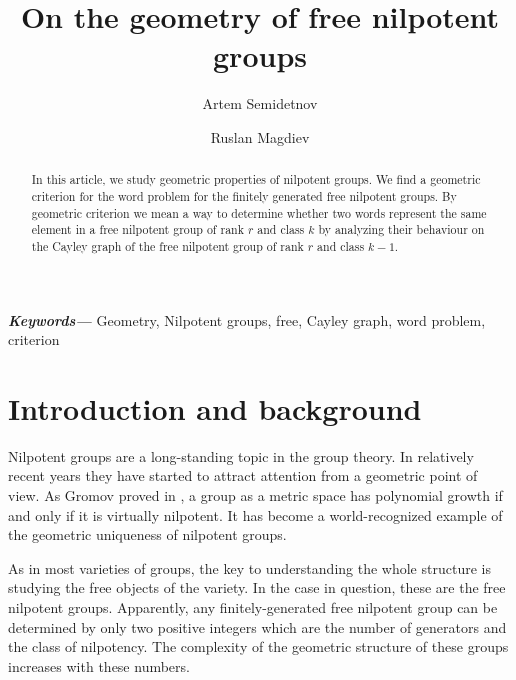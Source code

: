 \documentclass[11pt]{amsart}
\theoremstyle{plain}
\theoremstyle{definition}
\numberwithin{equation}{section}
\begin{document}
\providecommand{\keywords}[1]
{
  \small	
  \textbf{\textit{Keywords---}} #1
}
\title{On the geometry of free nilpotent groups}

\author{Artem Semidetnov}
\author{Ruslan Magdiev}

\address{Laboratory of Continuous Mathematical Education (School 564 of St. Petersburg), nab. Obvodnogo kanala 143, Saint Petersburg, Russia}
\address{ St. Petersburg State University, 14th Line, 29b, Saint Petersburg, 199178 Russia}


\begin{abstract}

In this article, we study geometric properties of nilpotent groups. We find a geometric criterion for the word problem for the finitely generated free nilpotent groups. By geometric criterion we mean a way to determine whether two words represent the same element in a free nilpotent group of rank $r$ and class $k$ by analyzing their behaviour on the Cayley graph of the free nilpotent group of rank $r$ and class $k-1$.
\end{abstract}

\keywords{Geometry, Nilpotent groups, free, Cayley graph, word problem, criterion}



\maketitle

\section{Introduction and background}

Nilpotent groups are a long-standing topic in the group theory. In relatively recent years they have started to attract attention from a geometric point of view. As Gromov proved in \cite{pol}, a group as a metric space has polynomial growth if and only if it is virtually nilpotent. It has become a world-recognized example of the geometric uniqueness of nilpotent groups. 


As in most varieties of groups, the key to understanding the whole structure is  studying the free objects of the variety. In the case in question, these are the free nilpotent groups. Apparently, any finitely-generated free nilpotent group can be determined by only two positive integers which are the number of generators and the class of nilpotency. The complexity of the geometric structure of these groups increases with these numbers.
\end{document}
